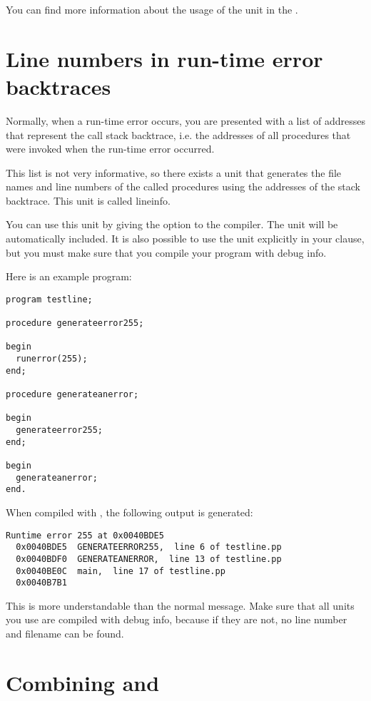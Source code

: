 You can find more information about the usage of the  unit
in the \unitsref.

\section{Line numbers in run-time error backtraces}
\label{se:lineinfo}

Normally, when a run-time error occurs, you are presented with a list
of addresses that represent the call stack backtrace, i.e. the addresses
of all procedures that were invoked when the run-time error occurred.

This list is not very informative, so there exists a unit that generates
the file names and line numbers of the called procedures using the
addresses of the stack backtrace. This unit is called lineinfo.

You can use this unit by giving the  option to the compiler. The
unit will be automatically included. It is also possible to use the unit
explicitly in your  clause, but you must make sure that you
compile your program with debug info.

Here is an example program:
\begin{verbatim}
program testline;

procedure generateerror255;

begin
  runerror(255);
end;

procedure generateanerror;

begin
  generateerror255;
end;

begin
  generateanerror;
end.
\end{verbatim}
When compiled with , the following output is generated:
\begin{verbatim}
Runtime error 255 at 0x0040BDE5
  0x0040BDE5  GENERATEERROR255,  line 6 of testline.pp
  0x0040BDF0  GENERATEANERROR,  line 13 of testline.pp
  0x0040BE0C  main,  line 17 of testline.pp
  0x0040B7B1
\end{verbatim}
This is more understandable than the normal message. Make sure that all
units you use are compiled with debug info, because if they are not, no
line number and filename can be found.

\section{Combining  and }

